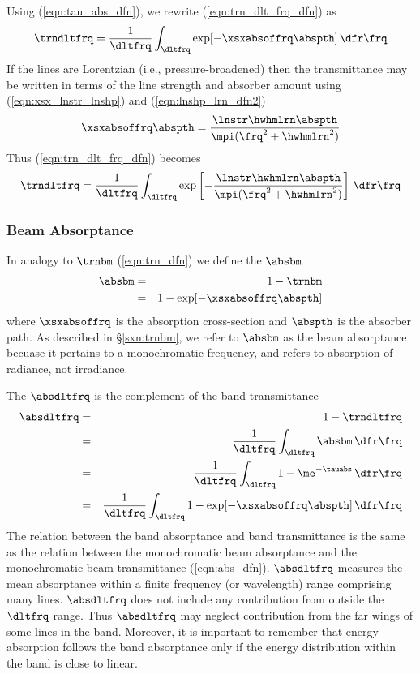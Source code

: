 \documentclass[12pt]{article}
\begin{document}
Using (\ref{eqn:tau_abs_dfn}), we rewrite (\ref{eqn:trn_dlt_frq_dfn})
as 
\begin{equation}
\trndltfrq = \frac{1}{\dltfrq} 
\int_{\dltfrq} \exp[-\xsxabsoffrq \abspth] \,\dfr\frq \nonumber
\end{equation}
If the lines are Lorentzian (i.e., pressure-broadened)
then the transmittance may be written in terms of the line strength and
absorber amount using (\ref{eqn:xsx_lnstr_lnshp}) and
(\ref{eqn:lnshp_lrn_dfn2}) 
\begin{equation}
\xsxabsoffrq \abspth = \frac{\lnstr \hwhmlrn \abspth}{\mpi(\frq^{2} + \hwhmlrn^{2})} 
\label{eqn:lrn_pth_dfn}
\end{equation}
Thus (\ref{eqn:trn_dlt_frq_dfn}) becomes
\begin{equation}
\trndltfrq = \frac{1}{\dltfrq} 
\int_{\dltfrq} \exp \left[ 
-\frac{\lnstr \hwhmlrn \abspth}{\mpi(\frq^{2} + \hwhmlrn^{2})} 
\right] \,\dfr\frq
\label{eqn:lrn_pth_dfn2}
\end{equation}

\subsubsection[Beam Absorptance]{Beam Absorptance}\label{sxn:absbm}
In analogy to $\trnbm$ (\ref{eqn:trn_dfn}) we define the
 $\absbm$
\begin{eqnarray}
\absbm & = & 1 - \trnbm \nonumber \\
& = & 1 - \exp[-\xsxabsoffrq \abspth]
\label{eqn:abs_dfn}
\end{eqnarray}
where $\xsxabsoffrq$ is the absorption cross-section and
$\abspth$ is the absorber path.
As described in \S\ref{sxn:trnbm}, we refer to $\absbm$ as the beam
absorptance becuase it pertains to a monochromatic frequency, and
refers to absorption of radiance, not irradiance.

The  $\absdltfrq$ is the complement of the
band transmittance
\begin{eqnarray}
\absdltfrq & = & 1 - \trndltfrq \nonumber \\
& = & \frac{1}{\dltfrq} \int_{\dltfrq} \absbm \,\dfr\frq \nonumber \\
& = & \frac{1}{\dltfrq} \int_{\dltfrq} 1 - \me^{-\tauabs} \,\dfr\frq \nonumber \\
& = & \frac{1}{\dltfrq} \int_{\dltfrq} 1 - \exp[-\xsxabsoffrq \abspth]
\,\dfr\frq
\label{eqn:abs_dlt_frq_dfn}
\end{eqnarray}
The relation between the band absorptance and band transmittance
is the same as the relation between the monochromatic beam absorptance
and the monochromatic beam transmittance (\ref{eqn:abs_dfn}).
$\absdltfrq$ measures the mean absorptance within a finite frequency
(or wavelength) range comprising many lines.
$\absdltfrq$ does not include any contribution from outside the
$\dltfrq$ range.
Thus $\absdltfrq$ may neglect contribution from the far wings of 
some lines in the band.
Moreover, it is important to remember that energy absorption follows 
the band absorptance only if the energy distribution within the band is
close to linear.
\end{document}
